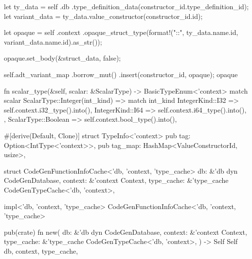 \documentclass[
  oneside,
  english,
  coorientadorbanca,
  noabntexcite
]{ufsc-thesis-rn46-2019}
\begin{document}
\begin{rustcode}
{{        let ty_data = self
            .db
            .type_definition_data(constructor_id.type_definition_id);
        let variant_data = ty_data.value_constructor(constructor_id.id);

        let opaque = self
            .context
            .opaque_struct_type(format!("{}::{}", ty_data.name.id, variant_data.name.id).as_str());

        opaque.set_body(&struct_data, false);

        self.adt_variant_map
            .borrow_mut()
            .insert(constructor_id, opaque);
        opaque
    }

    fn scalar_type(&self, scalar: &ScalarType) -> BasicTypeEnum<'context> {
        match scalar {
            ScalarType::Integer(int_kind) => match int_kind {
                IntegerKind::I32 => self.context.i32_type().into(),
                IntegerKind::I64 => self.context.i64_type().into(),
            },
            ScalarType::Boolean => self.context.bool_type().into(),
        }
    }
}

#[derive(Default, Clone)]
struct TypeInfo<'context> {
    pub tag: Option<IntType<'context>>,
    pub tag_map: HashMap<ValueConstructorId, usize>,
}

struct CodeGenFunctionInfoCache<'db, 'context, 'type_cache> {
    db: &'db dyn CodeGenDatabase,
    context: &'context Context,
    type_cache: &'type_cache CodeGenTypeCache<'db, 'context>,
}

impl<'db, 'context, 'type_cache> CodeGenFunctionInfoCache<'db, 'context, 'type_cache> {
    pub(crate) fn new(
        db: &'db dyn CodeGenDatabase,
        context: &'context Context,
        type_cache: &'type_cache CodeGenTypeCache<'db, 'context>,
    ) -> Self {
        Self {
            db,
            context,
            type_cache,
        }
    }

}
\end{rustcode}
\end{document}
